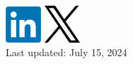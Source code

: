 \documentclass[A4,11pt]{article}
\begin{document}
\begin{minipage}[c]{0.4\textwidth}
    \href{https://www.linkedin.com/in/hafez-ghaemi-618b8287/}{\includegraphics[width=0.1\textwidth]{linkedin}}
    \href{https://x.com/hafezghm}{\includegraphics[width=0.1\textwidth]{x}}\\
    Last updated: July 15, 2024
\end{minipage}

\end{document}
